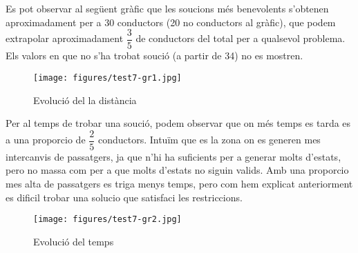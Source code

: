 Es pot observar al següent gràfic que les so\lgem ucions més benevolents s'obtenen aproximadament per a 30 conductors (20 no conductors al gràfic),
que podem extrapolar aproximadament $\dfrac{3}{5}$ de conductors del total per a qualsevol problema.
Els valors en que no s'ha trobat so\lgem ució (a partir de 34) no es mostren.

\begin{figure}[H]
\begin{center}
 \texttt{[image: figures/test7-gr1.jpg]}
 \label{test7-gr2}
\end{center}
\caption{Evolució del la distància}
\end{figure}

Per al temps de trobar una so\lgem ució, podem observar que on més temps es tarda es a una proporcio de $\dfrac{2}{5}$ conductors.
Intuïm que es la zona on es generen mes intercanvis de passatgers, ja que n'hi ha suficients per a generar molts d'estats,
pero no massa com per a que molts d'estats no siguin valids.
Amb una proporcio mes alta de passatgers es triga menys temps, pero com hem explicat anteriorment es dificil trobar una solucio que satisfaci les restriccions.

\begin{figure}[H]
\begin{center}
 \texttt{[image: figures/test7-gr2.jpg]}
 \label{test7-gr2}
\end{center}
\caption{Evolució del temps}
\end{figure}
        
